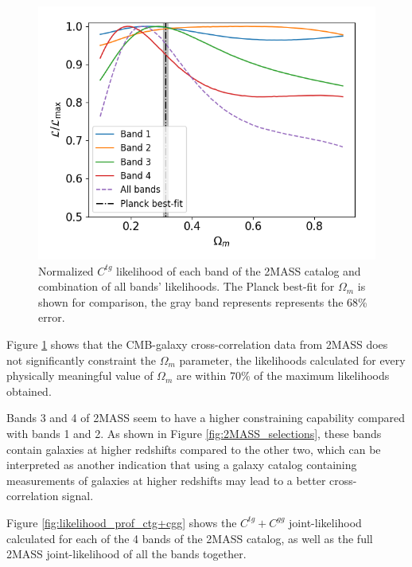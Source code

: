 \documentclass[openany,a4paper,12pt,oneside]{book}
\begin{document}
\begin{spacing}{1.5}
\begin{figure}[!htb]
	\centering
	\includegraphics[width=.7\linewidth]{Imagens/profile_ctg_Nmc2e7.png}
	\caption{Normalized $C^{tg}$ likelihood of each band of the 2MASS catalog and combination of all bands' likelihoods. The Planck best-fit for $\Omega_m$ is shown for comparison, the gray band represents represents the 68\% error.}
	\label{fig:likelihood_prof_ctg}
\end{figure}

Figure \ref{fig:likelihood_prof_ctg} shows that the CMB-galaxy cross-correlation data from 2MASS does not significantly constraint the $\Omega_m$ parameter, the likelihoods calculated for every physically meaningful value of $\Omega_m$ are within 70\% of the maximum likelihoods obtained. 

Bands 3 and 4 of 2MASS seem to have a higher constraining capability compared with bands 1 and 2. As shown in Figure \ref{fig:2MASS_selections}, these bands contain galaxies at higher redshifts compared to the other two, which can be interpreted as another indication that using a galaxy catalog containing measurements of galaxies at higher redshifts may lead to a better cross-correlation signal.

Figure \ref{fig:likelihood_prof_ctg+cgg} shows the $C^{tg}+C^{gg}$ joint-likelihood calculated for each of the 4 bands of the 2MASS catalog, as well as the full 2MASS joint-likelihood of all the bands together. 


\end{spacing}
\end{document}
